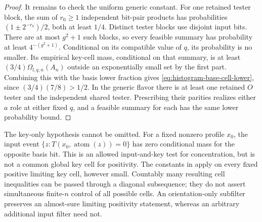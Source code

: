\begin{proof}
It remains to check the uniform generic constant. For one retained
tester block, the sum of $r_0\ge1$ independent bit-pair products has
probabilities $(1\pm2^{-r_0})/2$, both at least $1/4$. Distinct tester
blocks use disjoint input bits. There are at most $g^2+1$ such blocks,
so every feasible summary has probability at least
$4^{-(g^2+1)}$. Conditional on its compatible value of $q$, its
probability is no smaller. Its empirical key-cell mass, conditional
on that summary, is at least $(3/4)\Omega_{l,q,n}(A_n)$ outside an
exponentially small set by the first part. Combining this with the
basis lower fraction gives \eqref{eq:histogram-base-cell-lower}, since
$(3/4)(7/8)>1/2$. In the generic flavor there is at least one retained
$O$ tester and the independent shared tester. Prescribing their
parities realizes either $a$ role at either fixed $q$, and a feasible
summary for each has the same lower probability bound.
\end{proof}

\begin{remark}\label{rem:unary-positivity-key-only}
The key-only hypothesis cannot be omitted. For a fixed nonzero
profile $x_0$, the input event
$\{z:T(x_0,\operatorname{atom}(z))=0\}$ has zero conditional mass for
the opposite basis bit. This is an allowed input-and-key test for
concentration, but is not a common global key cell for positivity.
The constants in  apply on every fixed
positive limiting key cell, however small. Countably many resulting
cell inequalities can be passed through a diagonal subsequence;
they do not assert simultaneous finite-$n$ control of all possible
cells. An orientation-only subfilter preserves an almost-sure
limiting positivity statement, whereas an arbitrary additional input
filter need not.
\end{remark}
